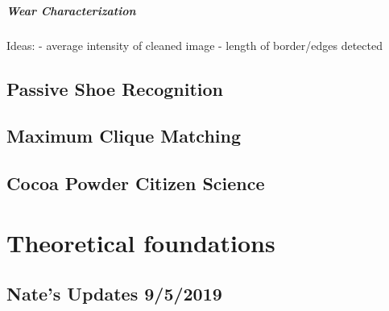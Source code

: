 \documentclass[]{book}
\let\oldparagraph\paragraph
\renewcommand{\paragraph}[1]{\oldparagraph{#1}\mbox{}}
\begin{document}
\hypertarget{wear-characterization}{%
\paragraph{Wear Characterization}\label{wear-characterization}}

Ideas:
- average intensity of cleaned image
- length of border/edges detected

\hypertarget{connor}{%
\section{Passive Shoe Recognition}\label{connor}}

\hypertarget{soyoung}{%
\section{Maximum Clique Matching}\label{soyoung}}

\hypertarget{cocoa}{%
\section{Cocoa Powder Citizen Science}\label{cocoa}}

\hypertarget{theoretical-foundations}{%
\chapter{Theoretical foundations}\label{theoretical-foundations}}

\hypertarget{nates-updates-952019}{%
\section{Nate's Updates 9/5/2019}\label{nates-updates-952019}}
\end{document}
